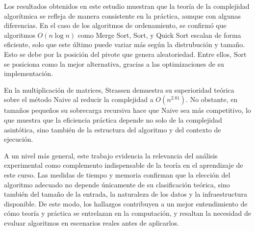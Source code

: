Los resultados obtenidos en este estudio muestran que la teoría de la complejidad algorítmica 
se refleja de manera consistente en la práctica, aunque con algunas diferencias. 
En el caso de los algoritmos de ordenamiento, se confirmó que algoritmos $O(n \log n)$ como Merge Sort, Sort, y Quick Sort escalan de forma eficiente, solo que este último puede variar más según la distrubución y tamaño.
Esto se debe por la posición del pivote que genera aleatoriedad.  
Entre ellos, Sort se posiciona como la mejor alternativa, 
gracias a las optimizaciones de su implementación.

En la multiplicación de matrices, Strassen demuestra su superioridad teórica sobre el método Naive al reducir la complejidad a $O(n^{2.81})$. 
No obstante, en tamaños pequeños su sobrecarga recursiva hace que Naive sea más competitivo, lo que muestra que la eficiencia práctica 
depende no solo de la complejidad asintótica, sino también de la estructura del algoritmo y del contexto de ejecución.

A un nivel más general, este trabajo evidencia la relevancia del análisis experimental como complemento indispensable de la teoría en el aprendizaje de este curso. 
Las medidas de tiempo y memoria confirman que la elección del algoritmo adecuado no depende únicamente de su clasificación teórica, 
sino también del tamaño de la entrada, la naturaleza de los datos y la infraestructura disponible. 
De este modo, los hallazgos contribuyen a un mejor entendimiento de cómo teoría y práctica se entrelazan en la computación, 
y resaltan la necesidad de evaluar algoritmos en escenarios reales antes de aplicarlos.